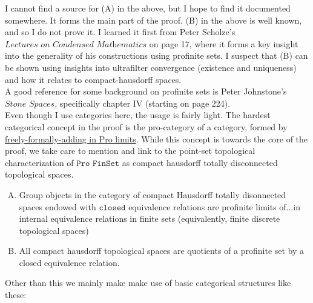 \documentclass[13pt]{amsart}
\begin{document}
I cannot find a source for (A) in the above, but I hope to find it documented somewhere. It forms the main part of the proof. (B) in the above is well known, and so I do not prove it. I learned it first from Peter Scholze's $\textit{Lectures on Condensed Mathematics}$ on page 17, where it forms a key insight into the generality of his constructions using profinite sets. I suspect that (B) can be shown using insights into ultrafilter convergence (existence and uniqueness) and how it relates to compact-hausdorff spaces.\\

A good reference for some background on profinite sets is Peter Johnstone's \href{https://books.google.com/books?id=CiWwoLNbpykC&printsec=frontcover&source=gbs_ge_summary_r&cad=0#v=onepage&q&f=false}{$\textit{Stone Spaces}$}, specifically chapter IV (starting on page 224).\\

Even though I use categories here, the usage is fairly light. The hardest categorical concept in the proof is the pro-category of a category, formed by \href{https://mathoverflow.net/questions/16917/what-is-a-reference-for-profinite-sets/16929#16929}{freely-formally-adding in Pro limits}. While this concept is towards the core of the proof, we take care to mention and link to the point-set topological characterization of $\texttt{Pro FinSet}$ as compact hausdorff totally disconnected topological spaces.\\

\begin{enumerate}[(A)]
\item Group objects in the category of compact Hausdorff totally disonnected spaces endowed with $\texttt{closed}$ equivalence relations are profinite limits of...in internal equivalence relations in finite sets (equivalently, finite discrete topological spaces)
\item All compact hausdorff topological spaces are quotients of a profinite set by a closed equivalence relation.
\end{enumerate}

Other than this we mainly make make use of basic categorical structures like these:

\iffalse
\begin{center}
\begin{tcolorbox}[width=5in,colback={white},title={\begin{center}\texttt{Note} \addtocounter{lcounter}{1}  \end{center}},colbacktitle=Blue,coltitle=black]
\begin{verbatim}

variable {X : Type}
variable {Y : Type}
variable {C : Category X}
variable {D : Category Y}
variable {F : Functor C D}
variable {G : Functor C D}
variable {η : NaturalTransform F G}

-- definition of fully faithful functor
-- definition of an essential surjection
-- NatExt is an extensionality result for natural transformations

\end{verbatim}
\end{tcolorbox}
\end{center}
\fi
\end{document}
